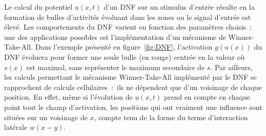 \documentclass[../main]{subfiles}
\begin{document}
Le calcul du potentiel $u(x,t)$ d'un DNF sur un stimulus d'entrée résulte en la formation de bulles d'activités évoluant dans les zones ou le signal d'entrée est élevé.
Les comportements du DNF varient en fonction des paramètres choisis~; une des applications possibles est l'implémentation d'un mécanisme de Winner-Take-All. 
Dans l'exemple présenté en figure~\ref{fig:DNF}, l'activation $g(u(x))$ du DNF évoluera pour former une seule bulle (en rouge) centrée en la valeur où $s(x)$ est maximal, sans représenter le maximum secondaire de $s$.
Par ailleurs, les calculs permettant le mécanisme Winner-Take-All implémenté par le DNF se rapprochent de calculs cellulaires~:~ils ne dépendent que d'un voisinage de chaque position.
En effet, même si l'évolution de $u(x,t)$ prend en compte en chaque point tout le champ d'activation, les positions qui ont vraiment une influence sont situées sur un voisinage de $x$, compte tenu de la forme du terme d'interaction latérale $w(x-y)$.
\end{document}
